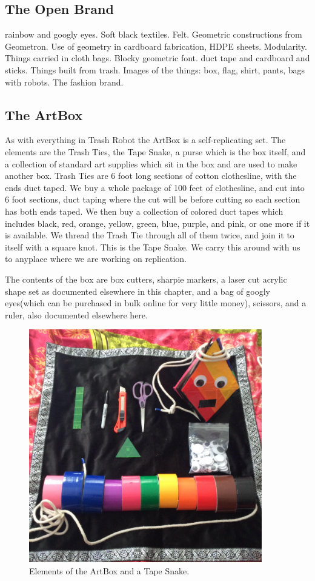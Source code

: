 \subsection{The Open Brand}

rainbow and googly eyes.  Soft black textiles. Felt.  Geometric constructions from Geometron.  Use of geometry in cardboard fabrication, HDPE sheets. Modularity.  Things carried in cloth bags. Blocky geometric font.  duct tape and cardboard and sticks. Things built from trash.  Images of the things: box, flag, shirt, pants, bags with robots.  The fashion brand.  

\subsection{The ArtBox}

As with everything in Trash Robot the ArtBox is a self-replicating set.  The elements are the Trash Ties, the Tape Snake, a purse which is the box itself, and a collection of standard art supplies which sit in the box and are used to make another box.  Trash Ties are 6 foot long sections of cotton clothesline, with the ends duct taped.  We buy a whole package of 100 feet of clothesline, and cut into 6 foot sections, duct taping where the cut will be before cutting so each section has both ends taped.  We then buy a collection of colored duct tapes which includes black, red, orange, yellow, green, blue, purple, and pink, or one more if it is available.  We thread the Trash Tie through all of them twice, and join it to itself with a square knot.  This is the Tape Snake.  We carry this around with us to anyplace where we are working on replication. 

The contents of the box are box cutters, sharpie markers, a laser cut acrylic shape set as documented elsewhere in this chapter, and a bag of googly eyes(which can be purchased in bulk online for very little money), scissors, and a ruler, also documented elsewhere here.


\begin{figure}
	\centering
	\includegraphics[width=4in]{figures/artboxelements.jpg}
	\caption[artboxelements]
	{Elements of the ArtBox and a Tape Snake.}
\end{figure}


